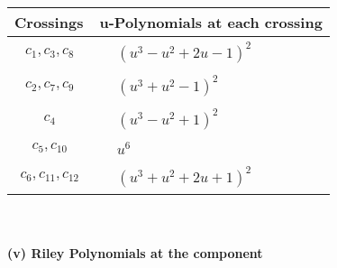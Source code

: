 \documentclass[1p]{elsarticle_modified}
\theoremstyle{definition}
\begin{document}
\begin{tabular}{m{50pt}|m{274pt}}
Crossings & \hspace{64pt}u-Polynomials at each crossing \\
\hline $$\begin{aligned}c_{1},c_{3},c_{8}\end{aligned}$$&$\begin{aligned}
&(u^3- u^2+2 u-1)^2
\end{aligned}$\\
\hline $$\begin{aligned}c_{2},c_{7},c_{9}\end{aligned}$$&$\begin{aligned}
&(u^3+u^2-1)^2
\end{aligned}$\\
\hline $$\begin{aligned}c_{4}\end{aligned}$$&$\begin{aligned}
&(u^3- u^2+1)^2
\end{aligned}$\\
\hline $$\begin{aligned}c_{5},c_{10}\end{aligned}$$&$\begin{aligned}
&u^6
\end{aligned}$\\
\hline $$\begin{aligned}c_{6},c_{11},c_{12}\end{aligned}$$&$\begin{aligned}
&(u^3+u^2+2 u+1)^2
\end{aligned}$\\
\hline
\end{tabular}\\~\\
\newpage\renewcommand{\arraystretch}{1}
\flushleft \textbf{(v) Riley Polynomials at the component}\newline \\
\end{document}
